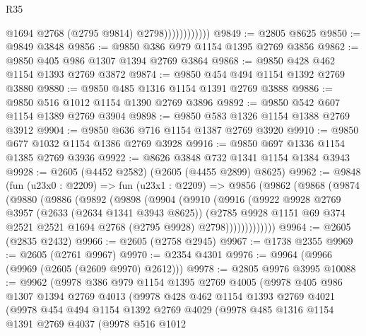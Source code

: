 \begin{lexlean}{R35}
\begin{coremodule}
                            @1694
                            @2768
                            (@2795 @9814)
                            @2798))))))))))))
@9849 := @2805 @8625
@9850 := @9849 @3848
@9856 := @9850 @386 @979 @1154 @1395 @2769 @3856
@9862 := @9850 @405 @986 @1307 @1394 @2769 @3864
@9868 := @9850 @428 @462 @1154 @1393 @2769 @3872
@9874 := @9850 @454 @494 @1154 @1392 @2769 @3880
@9880 := @9850 @485 @1316 @1154 @1391 @2769 @3888
@9886 := @9850 @516 @1012 @1154 @1390 @2769 @3896
@9892 := @9850 @542 @607 @1154 @1389 @2769 @3904
@9898 := @9850 @583 @1326 @1154 @1388 @2769 @3912
@9904 := @9850 @636 @716 @1154 @1387 @2769 @3920
@9910 := @9850 @677 @1032 @1154 @1386 @2769 @3928
@9916 := @9850 @697 @1336 @1154 @1385 @2769 @3936
@9922 := @8626 @3848 @732 @1341 @1154 @1384 @3943
@9928 := @2605 (@4452 @2582) (@2605 (@4455 @2899) @8625)
@9962 := @9848
    (fun (u23x0 : @2209) =>
    fun (u23x1 : @2209) =>
    @9856
      (@9862
        (@9868
          (@9874
            (@9880
              (@9886
                (@9892
                  (@9898
                    (@9904
                      (@9910
                        (@9916
                          (@9922
                            @9928
                            @2769
                            @3957
                            (@2633 (@2634 @1341 @3943 @8625))
                            (@2785
                              @9928
                              @1151
                              @69
                              @374
                              @2521
                              @2521
                              @1694
                              @2768
                              (@2795 @9928)
                              @2798)))))))))))))
@9964 := @2605 (@2835 @2432)
@9966 := @2605 (@2758 @2945)
@9967 := @1738 @2355
@9969 := @2605 (@2761 @9967)
@9970 := @2354 @4301
@9976 := @9964 (@9966 (@9969 (@2605 (@2609 @9970) @2612)))
@9978 := @2805 @9976 @3995
@10088 := @9962
    (@9978
      @386
      @979
      @1154
      @1395
      @2769
      @4005
      (@9978
        @405
        @986
        @1307
        @1394
        @2769
        @4013
        (@9978
          @428
          @462
          @1154
          @1393
          @2769
          @4021
          (@9978
            @454
            @494
            @1154
            @1392
            @2769
            @4029
            (@9978
              @485
              @1316
              @1154
              @1391
              @2769
              @4037
              (@9978
                @516
                @1012

\end{coremodule}
\end{lexlean}
